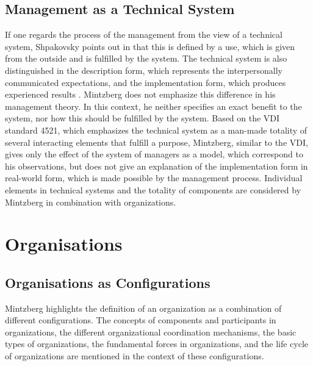 \documentclass[a4paper,12pt]{article}
\begin{document}
\subsection{Management as a Technical System}

If one regards the process of the management from the view of a technical
system, Shpakovsky points out in \cite{shpakovsky} that this is defined by a
use, which is given from the outside and is fulfilled by the system. The
technical system is also distinguished in the description form, which
represents the interpersonally communicated expectations, and the
implementation form, which produces experienced results \cite{graebe:2020}.
Mintzberg does not emphasize this difference in his management theory. In this
context, he neither specifies an exact benefit to the system, nor how this
should be fulfilled by the system. Based on the VDI standard 4521, which
emphasizes the technical system as a man-made totality of several interacting
elements that fulfill a purpose, Mintzberg, similar to the VDI, gives only the
effect of the system of managers as a model, which correspond to his
observations, but does not give an explanation of the implementation form in
real-world form, which is made possible by the management process. Individual
elements in technical systems and the totality of components are considered by
Mintzberg in combination with organizations.

\section{Organisations}

\subsection{Organisations as Configurations}

Mintzberg highlights the definition of an organization as a combination of
different configurations. The concepts of components and participants in
organizations, the different organizational coordination mechanisms, the basic
types of organizations, the fundamental forces in organizations, and the life
cycle of organizations are mentioned in the context of these configurations.
\end{document}
